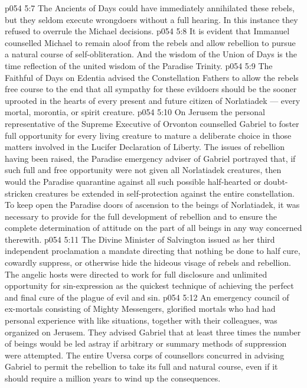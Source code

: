 \vs p054 5:7 \bibnobreakspace The Ancients of Days could have immediately annihilated these rebels, but they seldom execute wrongdoers without a full hearing. In this instance they refused to overrule the Michael decisions.
\vs p054 5:8 \bibnobreakspace It is evident that Immanuel counselled Michael to remain aloof from the rebels and allow rebellion to pursue a natural course of self\hyp{}obliteration. And the wisdom of the Union of Days is the time reflection of the united wisdom of the Paradise Trinity.
\vs p054 5:9 \bibnobreakspace The Faithful of Days on Edentia advised the Constellation Fathers to allow the rebels free course to the end that all sympathy for these evildoers should be the sooner uprooted in the hearts of every present and future citizen of Norlatiadek --- every mortal, morontia, or spirit creature.
\vs p054 5:10 \bibnobreakspace On Jerusem the personal representative of the Supreme Executive of Orvonton counselled Gabriel to foster full opportunity for every living creature to mature a deliberate choice in those matters involved in the Lucifer Declaration of Liberty. The issues of rebellion having been raised, the Paradise emergency adviser of Gabriel portrayed that, if such full and free opportunity were not given all Norlatiadek creatures, then would the Paradise quarantine against all such possible half\hyp{}hearted or doubt\hyp{}stricken creatures be extended in self\hyp{}protection against the entire constellation. To keep open the Paradise doors of ascension to the beings of Norlatiadek, it was necessary to provide for the full development of rebellion and to ensure the complete determination of attitude on the part of all beings in any way concerned therewith.
\vs p054 5:11 \bibnobreakspace The Divine Minister of Salvington issued as her third independent proclamation a mandate directing that nothing be done to half cure, cowardly suppress, or otherwise hide the hideous visage of rebels and rebellion. The angelic hosts were directed to work for full disclosure and unlimited opportunity for sin\hyp{}expression as the quickest technique of achieving the perfect and final cure of the plague of evil and sin.
\vs p054 5:12 \bibnobreakspace An emergency council of ex\hyp{}mortals consisting of Mighty Messengers, glorified mortals who had had personal experience with like situations, together with their colleagues, was organized on Jerusem. They advised Gabriel that at least three times the number of beings would be led astray if arbitrary or summary methods of suppression were attempted. The entire Uversa corps of counsellors concurred in advising Gabriel to permit the rebellion to take its full and natural course, even if it should require a million years to wind up the consequences.
